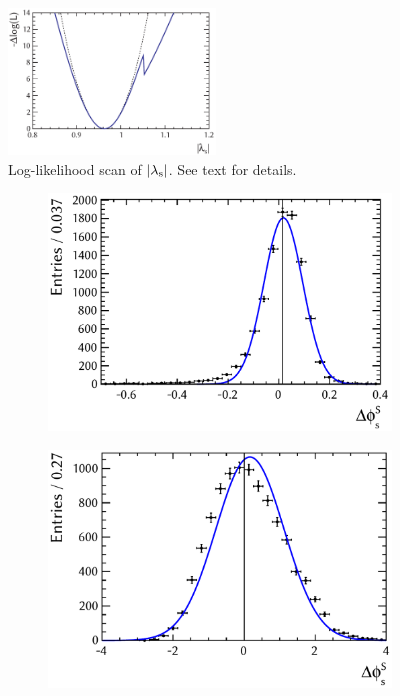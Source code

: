 \begin{figure}[tbp]
  \centering
  \includegraphics[width=0.49\textwidth]{graphics/results/NLL_lamb_phi_lambdaCP}
  \caption{Log-likelihood scan of $|{\lambda_{\text{s}}}|$. See text for details.}
  \label{fig:NLL_polarDep_lambdas}
\end{figure}

\begin{figure}[tbp]
  \centering
  \begin{subfigure}{0.49\textwidth}
    \includegraphics[width=\textwidth]{graphics/results/parDist_polarDep_phiCPRel_AS}
    \caption{}
  \end{subfigure}
  \hfill%
  \begin{subfigure}{0.49\textwidth}
    \includegraphics[width=\textwidth]{graphics/results/pullDist_polarDep_phiCPRel_AS}
    \caption{}
  \end{subfigure}


\end{figure}

